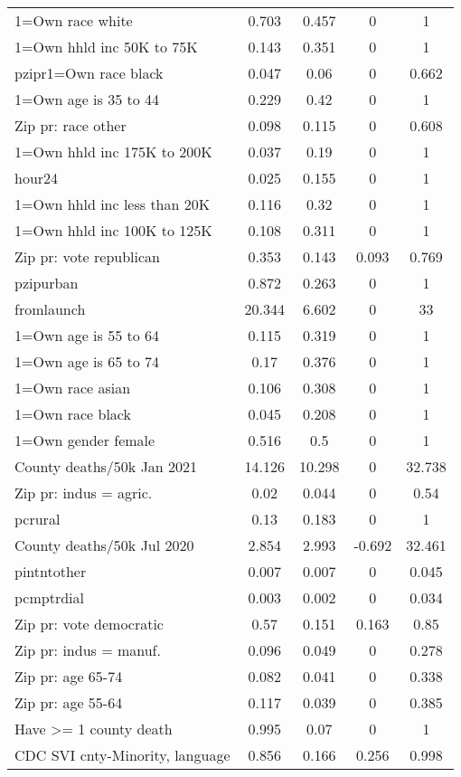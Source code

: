 {\begin{longtable}{l*{4}{c}}
 1=Own race white & 0.703 & 0.457 & 0 & 1  \\ 
 1=Own hhld inc 50K to 75K & 0.143 & 0.351 & 0 & 1  \\ 
 pzipr1=Own race black & 0.047 & 0.06 & 0 & 0.662  \\ 
 1=Own age is 35 to 44 & 0.229 & 0.42 & 0 & 1  \\ 
 Zip pr: race other & 0.098 & 0.115 & 0 & 0.608  \\ 
 1=Own hhld inc 175K to 200K & 0.037 & 0.19 & 0 & 1  \\ 
 hour24 & 0.025 & 0.155 & 0 & 1  \\ 
 1=Own hhld inc less than 20K & 0.116 & 0.32 & 0 & 1  \\ 
 1=Own hhld inc 100K to 125K & 0.108 & 0.311 & 0 & 1  \\ 
 Zip pr: vote republican & 0.353 & 0.143 & 0.093 & 0.769  \\ 
 pzipurban & 0.872 & 0.263 & 0 & 1  \\ 
 fromlaunch & 20.344 & 6.602 & 0 & 33  \\ 
 1=Own age is 55 to 64 & 0.115 & 0.319 & 0 & 1  \\ 
 1=Own age is 65 to 74 & 0.17 & 0.376 & 0 & 1  \\ 
 1=Own race asian & 0.106 & 0.308 & 0 & 1  \\ 
 1=Own race black & 0.045 & 0.208 & 0 & 1  \\ 
 1=Own gender female & 0.516 & 0.5 & 0 & 1  \\ 
 County deaths/50k Jan 2021 & 14.126 & 10.298 & 0 & 32.738  \\ 
 Zip pr: indus = agric. & 0.02 & 0.044 & 0 & 0.54  \\ 
 pcrural & 0.13 & 0.183 & 0 & 1  \\ 
 County deaths/50k Jul 2020 & 2.854 & 2.993 & -0.692 & 32.461  \\ 
 pintntother & 0.007 & 0.007 & 0 & 0.045  \\ 
 pcmptrdial & 0.003 & 0.002 & 0 & 0.034  \\ 
 Zip pr: vote democratic & 0.57 & 0.151 & 0.163 & 0.85  \\ 
 Zip pr: indus = manuf. & 0.096 & 0.049 & 0 & 0.278  \\ 
 Zip pr: age 65-74 & 0.082 & 0.041 & 0 & 0.338  \\ 
 Zip pr: age 55-64 & 0.117 & 0.039 & 0 & 0.385  \\ 
 Have >= 1 county death & 0.995 & 0.07 & 0 & 1  \\ 
 CDC SVI cnty-Minority, language & 0.856 & 0.166 & 0.256 & 0.998  \\ 

\end{longtable}}
